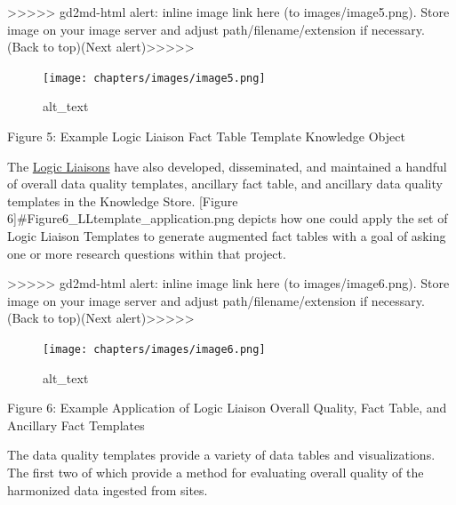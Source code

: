 \documentclass[
  letterpaper,
  DIV=11,
  numbers=noendperiod]{scrreprt}
\begin{document}
{\textgreater\textgreater\textgreater\textgreater\textgreater{}
gd2md-html alert: inline image link here (to images/image5.png). Store
image on your image server and adjust path/filename/extension if
necessary. }(Back to top)(Next
alert){\textgreater\textgreater\textgreater\textgreater\textgreater{} }

\begin{figure}

{\centering \texttt{[image: chapters/images/image5.png]}

}

\caption{alt\_text}

\end{figure}

Figure 5: Example Logic Liaison Fact Table Template Knowledge Object

The \href{https://covid.cd2h.org/liaisons}{Logic Liaisons} have also
developed, disseminated, and maintained a handful of overall data
quality templates, ancillary fact table, and ancillary data quality
templates in the Knowledge Store. {[}Figure
6{]}\#Figure6\_LLtemplate\_application.png depicts how one could apply
the set of Logic Liaison Templates to generate augmented fact tables
with a goal of asking one or more research questions within that
project.

{\textgreater\textgreater\textgreater\textgreater\textgreater{}
gd2md-html alert: inline image link here (to images/image6.png). Store
image on your image server and adjust path/filename/extension if
necessary. }(Back to top)(Next
alert){\textgreater\textgreater\textgreater\textgreater\textgreater{} }

\begin{figure}

{\centering \texttt{[image: chapters/images/image6.png]}

}

\caption{alt\_text}

\end{figure}

Figure 6: Example Application of Logic Liaison Overall Quality, Fact
Table, and Ancillary Fact Templates

The data quality templates provide a variety of data tables and
visualizations. The first two of which provide a method for evaluating
overall quality of the harmonized data ingested from sites.
\end{document}
